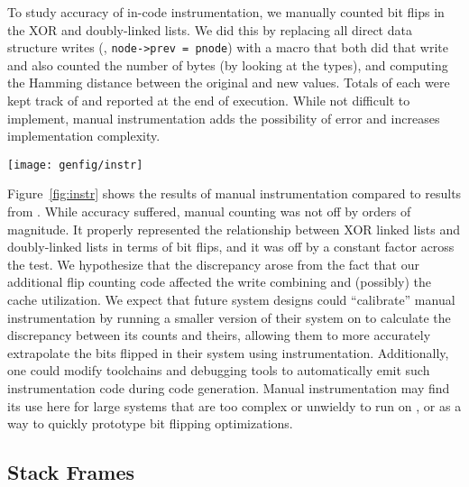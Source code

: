 To study accuracy of in-code instrumentation, we
manually counted bit flips in the XOR and doubly-linked lists.
We did this by replacing all direct data structure writes (\eg, \texttt{node->prev =
	pnode}) with a macro that both did that write and also counted the number of bytes (by looking
at the types), and computing the Hamming distance between the original and new values. Totals of
each were kept track of and reported at the end of execution. While not difficult to
implement, manual instrumentation adds the possibility of error and increases implementation
complexity.

\begin{SCfigure}
	\centering
	\texttt{[image: genfig/instr]}
	\caption[Instrumentation vs. simulation for bit flips]{Manual instrumentation for counting bit flips (instr) compared to
		full-system simulation (sim).}
	\label{fig:instr}
\end{SCfigure}


Figure~\ref{fig:instr} shows the results of manual instrumentation compared to
results from \gem. While accuracy suffered, manual counting was not off by
orders of magnitude. It properly represented the relationship between XOR
linked lists and doubly-linked lists in terms of bit flips, and it was off by a
constant factor across the test. We hypothesize that the discrepancy arose from the fact that our
additional flip counting code affected the write combining and (possibly) the cache
utilization. We expect that
future system designs could ``calibrate'' manual instrumentation by running
a smaller version of their system on \gem to calculate the discrepancy between
its counts and theirs, allowing them to more accurately extrapolate the bits
flipped
in their system using instrumentation. Additionally, one could modify
toolchains and debugging tools to automatically emit such instrumentation code
during code generation. Manual instrumentation may find its use here for large systems that are too
complex or unwieldy to run on \gem, or as a way to quickly prototype bit flipping optimizations.


\subsection{Stack Frames}

